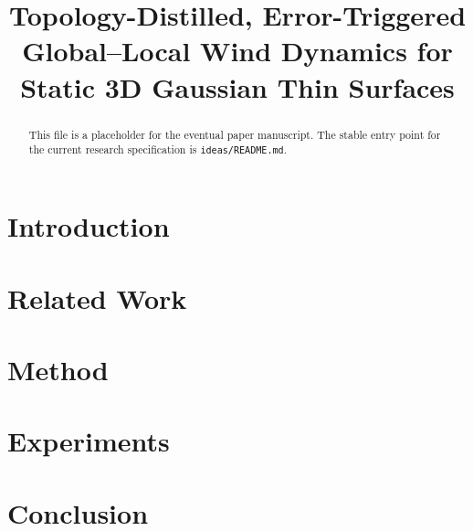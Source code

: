 \documentclass[10pt,twocolumn]{article}
\title{Topology-Distilled, Error-Triggered Global--Local Wind Dynamics for Static 3D Gaussian Thin Surfaces}
\author{}
\date{}
\begin{document}
\maketitle

\begin{abstract}
This file is a placeholder for the eventual paper manuscript. The stable entry point for the current research specification is \texttt{ideas/README.md}.
\end{abstract}

\section{Introduction}

\section{Related Work}

\section{Method}

\section{Experiments}

\section{Conclusion}



\end{document}
